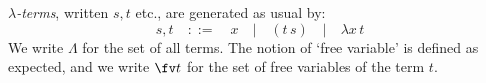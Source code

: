 









\emph{$\lambda$-terms}, written $s,t$ etc., are generated as usual by:
\[
s,t \quad ::= \quad 
x \quad | \quad (t\, s) \quad | \quad \lambda x \,  t 
\]
We write $\Lambda$ for the set of all terms.
The notion of `free variable' is defined as expected, and we write $\fv t $ for the set of free variables of the term $t$.






\newcommand{\doublepair}[2]{\langle \! \langle {#1}, {#2}\rangle \! \rangle}
\newcommand{\doubleproj}[2]{\pi_{#1}\,  {#2}}
\newcommand{\godel}[1]{\lceil {#1} \rceil}

